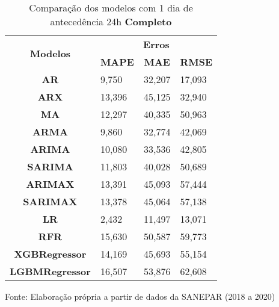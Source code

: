 \begin{table}[H]
	\centering
	\caption{Comparação dos modelos com 1 dia de antecedência 24h \textbf{Completo} }\label{tb:1-24cm}
	\begin{tabular}{@{}clll@{}}
		\toprule
		\multirow{2}{*}{\textbf{Modelos}} & \multicolumn{3}{c}{\textbf{Erros}}                                                                       \\ \cmidrule(l){2-4} 
		& \multicolumn{1}{c}{\textbf{MAPE}} & \multicolumn{1}{c}{\textbf{MAE}} & \multicolumn{1}{c}{\textbf{RMSE}} \\ \hline
\textbf{AR}                       & 9,750                             & 32,207                           & 17,093                            \\
\textbf{ARX}                      & 13,396                            & 45,125                           & 32,940                            \\
\textbf{MA}                       & 12,297                            & 40,335                           & 50,963                            \\
\textbf{ARMA}                     & 9,860                             & 32,774                           & 42,069                            \\
\textbf{ARIMA}                    & 10,080                            & 33,536                           & 42,805                            \\
\textbf{SARIMA}                   & 11,803                            & 40,028                           & 50,689                            \\
\textbf{ARIMAX}                   & 13,391                            & 45,093                           & 57,444                            \\
\textbf{SARIMAX}                  & 13,378                            & 45,064                           & 57,138                            \\
\textbf{LR}        & 2,432                             & 11,497                           & 13,071                            \\
\textbf{RFR}  & 15,630                            & 50,587                           & 59,773                            \\
\textbf{XGBRegressor}             & 14,169                            & 45,693                           & 55,154                            \\
\textbf{LGBMRegressor}            & 16,507                            & 53,876                           & 62,608                            \\ \bottomrule
	\end{tabular}

Fonte: Elaboração própria a partir de dados da SANEPAR (2018 a 2020)
\end{table}


